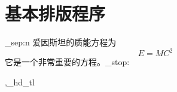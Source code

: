 \documentclass[a4paper,fontset = windowsnew]{ctexbook}
\begin{document}
\chapter{基本排版程序}


\ExplSyntaxOn
\cexam_sep:n 爱因斯坦的质能方程为
\begin{equation}
   E=MC^2
\end{equation}
它是一个非常重要的方程。\scan_stop:

\sep_hd_tl

\ExplSyntaxOff
\end{document}
